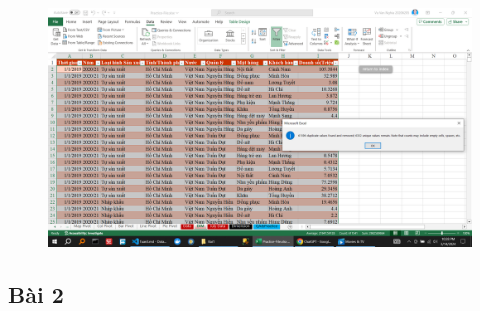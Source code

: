 \documentclass{article}
\begin{document}







 
 
\begin{figure}[H]
    \centering
    \includegraphics[scale = 0.15]{Bai1/ThucHanh/2.png}
    \end{figure}
\subsection{Bài 2}
  

\end{document}
